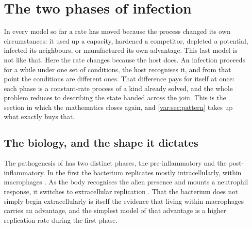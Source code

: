 
\section{The two phases of infection}
\label{var:sec:twophase}

In every model so far a rate has moved because the process changed its own
circumstances: it used up a capacity, hardened a competitor, depleted a
potential, infected its neighbours, or manufactured its own advantage. This
last model is not like that. Here the rate changes because the host does. An
infection proceeds for a while under one set of conditions, the host
recognises it, and from that point the conditions are different ones. That
difference pays for itself at once: each phase is a constant-rate process of
a kind already solved, and the whole problem reduces to describing the state
handed across the join. This is the section in which the mathematics closes
again, and \cref{var:sec:pattern} takes up what exactly buys that.

\subsection{The biology, and the shape it dictates}
\label{var:sec:twophasebiology}

The pathogenesis of \yp{} has two distinct phases, the pre-inflammatory and
the post-inflammatory. In the first the bacterium replicates mostly
intracellularly, within macrophages
\cite{PujolBliska2003,ConnorEtAl2018}. As the body recognises the alien
presence and mounts a neutrophil response, it switches to extracellular
replication \cite{BosioEtAl2005,PetersEtAl2013}. That the bacterium does not
simply begin extracellularly is itself the evidence that living within
macrophages carries an advantage, and the simplest model of that advantage is
a higher replication rate during the first phase.

